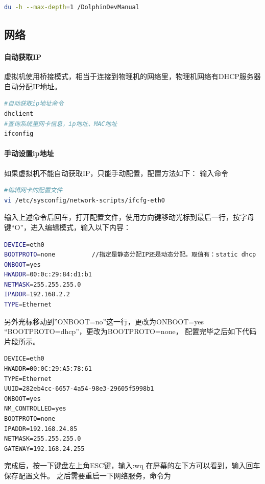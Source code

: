 \documentclass{book}
\begin{document}
\begin{lstlisting}[language=Bash]
du -h --max-depth=1 /DolphinDevManual
\end{lstlisting}

\subsection{网络}

\paragraph{自动获取IP}
虚拟机使用桥接模式，相当于连接到物理机的网络里，物理机网络有DHCP服务器自动分配IP地址。

\begin{lstlisting}[language=Bash]
#自动获取ip地址命令
dhclient 
#查询系统里网卡信息，ip地址、MAC地址
ifconfig 
\end{lstlisting}

\paragraph{手动设置ip地址}

如果虚拟机不能自动获取IP，只能手动配置，配置方法如下：
输入命令

\begin{lstlisting}[language=Bash]
#编辑网卡的配置文件
vi /etc/sysconfig/network-scripts/ifcfg-eth0
\end{lstlisting}

输入上述命令后回车，打开配置文件，使用方向键移动光标到最后一行，按字母键“O”，进入编辑模式，输入以下内容：

\begin{lstlisting}[language=Bash]
DEVICE=eth0
BOOTPROTO=none          //指定是静态分配IP还是动态分配。取值有：static dhcp
ONBOOT=yes
HWADDR=00:0c:29:84:d1:b1
NETMASK=255.255.255.0
IPADDR=192.168.2.2
TYPE=Ethernet
\end{lstlisting}

另外光标移动到”ONBOOT=no”这一行，更改为ONBOOT=yes
“BOOTPROTO=dhcp”，更改为BOOTPROTO=none，
配置完毕之后如下代码片段所示。

\begin{lstlisting}
DEVICE=eth0
HWADDR=00:0C:29:A5:78:61
TYPE=Ethernet
UUID=282eb4cc-6657-4a54-98e3-29605f5998b1
ONBOOT=yes
NM_CONTROLLED=yes
BOOTPROTO=none
IPADDR=192.168.24.85
NETMASK=255.255.255.0
GATEWAY=192.168.24.255
\end{lstlisting}

完成后，按一下键盘左上角ESC键，输入:wq 在屏幕的左下方可以看到，输入回车保存配置文件。
之后需要重启一下网络服务，命令为
\end{document}
